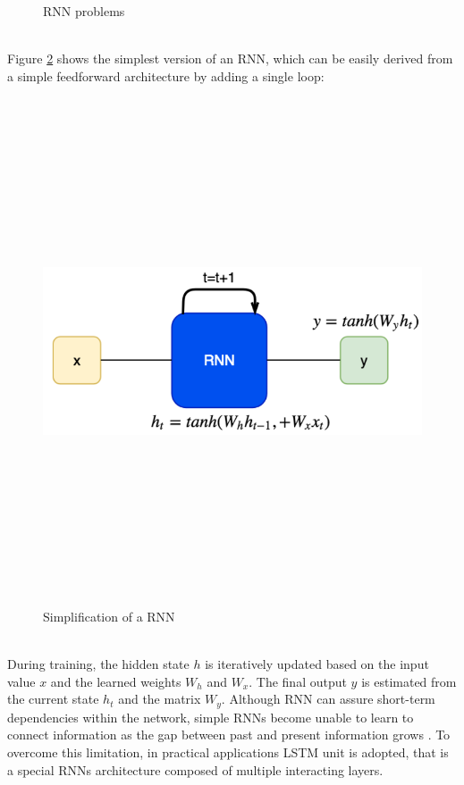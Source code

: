 \documentclass[11pt, a4paper]{article}
\begin{document}
\begin{figure}[H]
    \caption{RNN problems}
    \label{rnn1}
\end{figure} \\ \newline \noindent Figure \ref{rnn2} shows the simplest version of an RNN, which can be easily derived from a simple feedforward architecture by adding a single loop:\begin{figure}[H]
    \centering
    \includegraphics[width=15cm,height=15cm,keepaspectratio]{Figures/rnn2.png}
    \caption{Simplification of a RNN}
    \label{rnn2}
\end{figure} \\ \newline \noindent During training, the hidden state $h$ is iteratively updated based on the input value $x$ and the learned weights $W_h$  and $W_x$. The final output $y$  is estimated from the current state $h_t$  and the matrix $W_y$. Although RNN can assure short-term dependencies within the network, simple RNNs become unable to learn to connect information as the gap between past and present information grows \cite{lstm}. To overcome this limitation, in practical applications LSTM unit is adopted, that is a special RNNs architecture composed of multiple interacting layers.\begin{figure}[H]

\end{figure}
\end{document}
